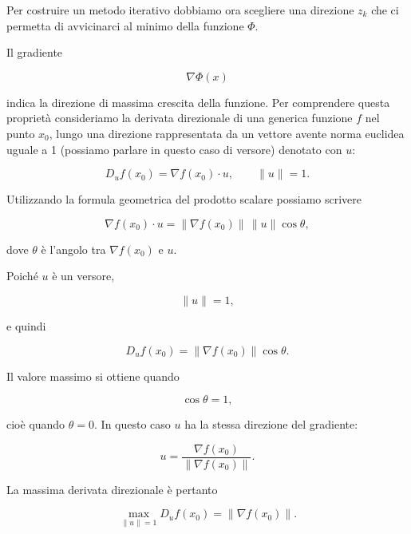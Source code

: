 Per costruire un metodo iterativo dobbiamo ora scegliere una
direzione $z_k$ che ci permetta di avvicinarci al minimo della
funzione $\Phi$.

Il gradiente

\begin{equation*}
    \nabla\Phi(x)
\end{equation*}

indica la direzione di massima crescita della funzione. Per
comprendere questa proprietà consideriamo la derivata direzionale
di una generica funzione $f$ nel punto $x_0$, lungo una direzione
rappresentata da un vettore avente norma euclidea uguale a 1 (possiamo parlare in questo caso di versore) denotato con $u$:

\begin{equation*}
    D_uf(x_0)=\nabla f(x_0)\cdot u,
    \qquad
    \|u\|=1.
\end{equation*}

Utilizzando la formula geometrica del prodotto scalare possiamo scrivere

\begin{equation*}
    \nabla f(x_0)\cdot u
    =
    \|\nabla f(x_0)\|\,\|u\|\cos\theta,
\end{equation*}

dove $\theta$ è l'angolo tra $\nabla f(x_0)$ e $u$.

Poiché $u$ è un versore,

\begin{equation*}
    \|u\|=1,
\end{equation*}

e quindi

\begin{equation*}
    D_uf(x_0)
    =
    \|\nabla f(x_0)\|\cos\theta.
\end{equation*}

Il valore massimo si ottiene quando

\begin{equation*}
    \cos\theta=1,
\end{equation*}

cioè quando $\theta=0$. In questo caso $u$ ha la stessa direzione
del gradiente:

\begin{equation*}
    u=
    \frac{\nabla f(x_0)}
         {\|\nabla f(x_0)\|}.
\end{equation*}

La massima derivata direzionale è pertanto

\begin{equation*}
    \max_{\|u\|=1}D_uf(x_0)
    =
    \|\nabla f(x_0)\|.
\end{equation*}

